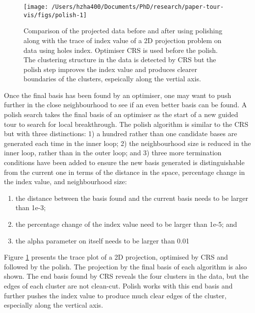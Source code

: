 \begin{Schunk}
\begin{figure}

{\centering \texttt{[image: /Users/hzha400/Documents/PhD/research/paper-tour-vis/figs/polish-1]} 

}

\caption[Comparison of the projected data before and after using polishing along with the trace of index value of a 2D projection problem on  data using holes index]{Comparison of the projected data before and after using polishing along with the trace of index value of a 2D projection problem on  data using holes index. Optimiser CRS is used before the polish. The clustering structure in the data is detected by CRS but the polish step improves the index value and produces clearer boundaries of the clusters, espeically along the vertial axis.}\label{fig:polish}
\end{figure}
\end{Schunk}

Once the final basis has been found by an optimiser, one may want to
push further in the close neighbourhood to see if an even better basis
can be found. A polish search takes the final basis of an optimiser as
the start of a new guided tour to search for local breakthrough. The
polish algorithm is similar to the CRS but with three distinctions: 1) a
hundred rather than one candidate bases are generated each time in the
inner loop; 2) the neighbourhood size is reduced in the inner loop,
rather than in the outer loop; and 3) three more termination conditions
have been added to ensure the new basis generated is distinguishable
from the current one in terms of the distance in the space, percentage
change in the index value, and neighbourhood size:

\begin{enumerate}
\def\labelenumi{\arabic{enumi})}
\tightlist
\item
  the distance between the basis found and the current basis needs to be
  larger than 1e-3;
\item
  the percentage change of the index value need to be larger than 1e-5;
  and
\item
  the alpha parameter on itself needs to be larger than 0.01
\end{enumerate}

Figure \ref{fig:polish} presents the trace plot of a 2D projection,
optimised by CRS and followed by the polish. The projection by the final
basis of each algorithm is also shown. The end basis found by CRS
reveals the four clusters in the data, but the edges of each cluster are
not clean-cut. Polish works with this end basis and further pushes the
index value to produce much clear edges of the cluster, especially along
the vertical axis.

